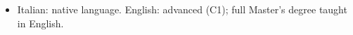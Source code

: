 \vspace{-20pt}

\begin{itemize}\itemsep0pt
  \item Italian: native language. English: advanced (C1); full Master's degree taught in English.
\end{itemize}

